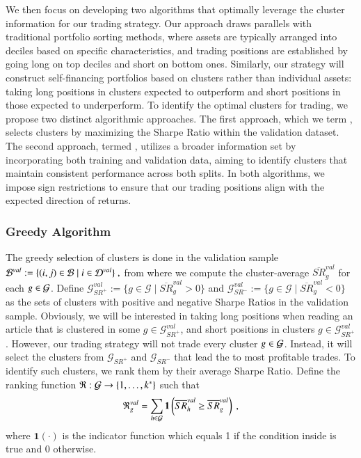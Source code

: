 \mx
We then focus on developing two algorithms that optimally leverage the cluster information for our trading strategy. Our approach draws parallels with traditional portfolio sorting methods, where assets are typically arranged into deciles based on specific characteristics, and trading positions are established by going long on top deciles and short on bottom ones. Similarly, our strategy will construct self-financing portfolios based on clusters rather than individual assets: taking long positions in clusters expected to outperform and short positions in those expected to underperform.
%
To identify the optimal clusters for trading, we propose two distinct algorithmic approaches. The first approach, which we term , selects clusters by maximizing the Sharpe Ratio within the validation dataset. The second approach, termed , utilizes a broader information set by incorporating both training and validation data, aiming to identify clusters that maintain consistent performance across both splits. In both algorithms, we impose sign restrictions to ensure that our trading positions align with the expected direction of returns.

\subsubsection{Greedy Algorithm}

The greedy selection of clusters is done in the validation sample 
$
\mathcal{B}^{val}:= \{
(i,j)\in\mathcal{B} 
 \mid 
  i \in \mathcal{D}^{val} \}
~,
$
from where we compute the cluster-average $\overline{S R}_g^{val}$ for each $g\in\mathcal{G}$.
%
Define $\mathcal G_{SR^+}^{val}:=\{ g\in \mathcal G \mid \overline{SR}_g^{val} >0\}$ and $\mathcal G_{SR^-}^{val}:=\{ g\in \mathcal G \mid \overline{SR}_g^{val} <0\}$ as the sets of clusters with positive and negative Sharpe Ratios in the validation sample. Obviously, we will be interested in taking long positions when reading an article that is clustered in some $g\in \mathcal G_{SR^+}^{val}$, and short positions in clusters $g\in \mathcal G_{SR^+}^{val}$. 
%
However, our trading strategy will not trade every cluster $g\in\mathcal{G}$. Instead, it will select the clusters from $\mathcal G_{SR^+}$ and $\mathcal G_{SR^-}$ that lead the to most profitable trades. 
To identify such clusters, we rank them by their average Sharpe Ratio. Define the ranking function $\mathfrak{R}: \mathcal{G} \to \left\{1, \ldots, k^*\right\}$ such that
$$
\mathfrak{R}_g^{val}
=
\sum_{h \in \mathcal{G}} 
\mathbf{1}\left(
\overline{S R}_h^{val} \geq \overline{S R}_g^{val} 
\right)
~,
$$
where $\mathbf{1}(\cdot)$ is the indicator function which equals 1 if the condition inside is true and 0 otherwise.

